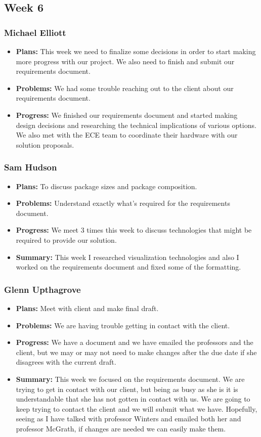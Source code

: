 \documentclass[onecolumn, draftclsnofoot,10pt, compsoc]{IEEEtran}
\begin{document}
\subsection {Week 6}
\subsubsection{Michael Elliott}
\begin {itemize}
\item \textbf{Plans: }
  This week we need to finalize some decisions in order to start making more progress with our project. We also need to finish and submit our requirements document.
\item \textbf{Problems: }
  We had some trouble reaching out to the client about our requirements document.
\item \textbf{Progress: }
  We finished our requirements document and started making design decisions and researching the technical implications of various options. We also met with the ECE team to coordinate their hardware with our solution proposals.
\end {itemize}
\subsubsection{Sam Hudson}
\begin {itemize}
\item \textbf{Plans: }To discuss package sizes and package composition.
\item \textbf{Problems: }Understand exactly what’s required for the requirements document.
\item \textbf{Progress: }We meet 3 times this week to discuss technologies that might be required to provide our solution.
\item \textbf{Summary: }This week I researched visualization technologies and also I worked on the requirements document and fixed some of the formatting.
\end {itemize}
\subsubsection{Glenn Upthagrove}
\begin {itemize}
 \item \textbf{Plans: }Meet with client and make final draft. 
 \item \textbf{Problems: }We are having trouble getting in contact with the client.
 \item \textbf{Progress: }We have a document and we have emailed the professors and the client, but we may or may not need to make changes after the due date if she disagrees with the current draft.
 \item \textbf{Summary: }This week we focused on the requirements document. We are trying to get in contact with our client, but being as busy as she is it is understandable that she has not gotten in contact with us. We are going to keep trying to contact the client and we will submit what we have. Hopefully, seeing as I have talked with professor Winters and emailed both her and professor McGrath, if changes are needed we can easily make them.  
\end {itemize}
\end{document}

